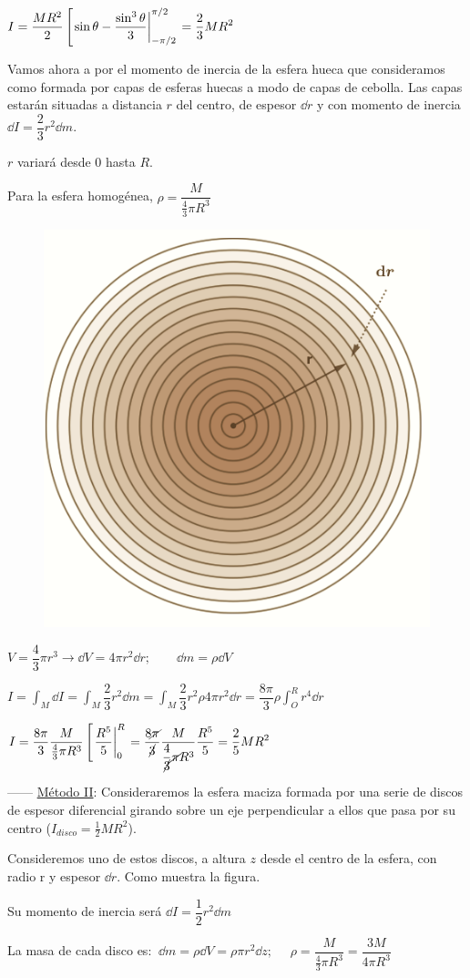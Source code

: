 $\displaystyle I=\dfrac{MR^2}{2} \left[\eval{\sin \theta - \dfrac {\sin^3 \theta}{3}}_{-\pi/2}^{\pi/2}\right.=\dfrac 2 3 MR^2$


\begin{multicols}{2}
Vamos ahora a por el momento de inercia de la esfera hueca que consideramos como formada por capas de esferas huecas a modo de capas de cebolla. Las capas estarán situadas a distancia $r$ del centro, de espesor $\dd r$ y con momento de inercia $\dd I=\dfrac 2 3 r^2 \dd m$. 

$r$ variará desde $0$ hasta $R$.

Para la esfera homogénea, 
$\rho=\dfrac {M}{\frac 4 3 \pi R^3}$
\begin{figure}[H]
	\centering
	\includegraphics[width=.3\textwidth]{imagenes/imagenes16/T16IM17.png}
\end{figure}
\end{multicols}

$V=\dfrac 4 3 \pi r^3 \to \dd V=4\pi r^2 \dd r;\qquad \dd m= \rho \dd V$

$\displaystyle I=\int_M \dd I =\int_M \dfrac 2 3 r^2 \dd m = \int_M \dfrac 2 3 r^2 \rho  4  \pi r^2 \dd r = \dfrac {8\pi}{3}\rho \int_O^R r^4 \dd r$

$\displaystyle I=
\dfrac {8\pi}{3} \dfrac {M}{\frac 4 3 \pi R^3} \left[ \eval{\dfrac {R^5}{5}}_0^R \right. = 
\dfrac {8\cancel{\pi}}{\cancel{3}} \dfrac{M}{\dfrac{4}{\cancel{3}}\cancel{\pi} R^3} \dfrac{R^5}{5} = \dfrac 2 5 M R^2$



------ \underline{Método II}: Consideraremos la esfera maciza formada por una serie de discos de espesor diferencial girando sobre un eje perpendicular a ellos que pasa por su centro ($I_{disco}=\frac 1 2 MR^2$).


Consideremos uno de estos discos, a altura $z$ desde el centro de la esfera, con radio r y espesor $\dd r$. Como muestra la figura.

Su momento de inercia será $\dd I=\dfrac 1 2 r^2 \dd m$

La masa de cada disco es:
$\ \dd m=\rho \dd V = \rho \pi r^2 \dd z;$
$\quad \rho=\dfrac{M}{\frac 4 3 \pi R^3}=\dfrac{3M}{4\pi R^3}$

